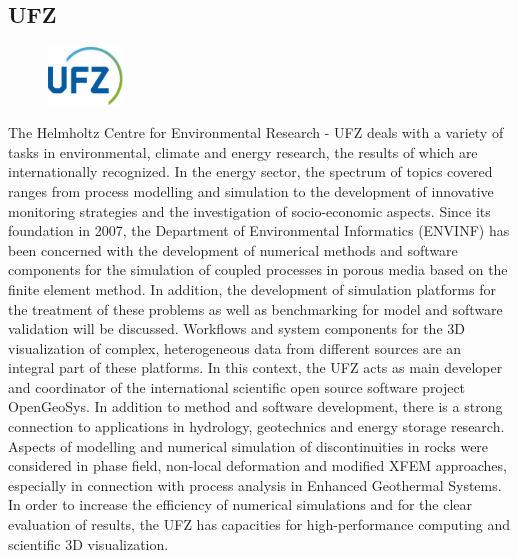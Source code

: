 \subsection{UFZ}
\begin{figure}
\centering
\includegraphics[width=2cm]{figures/ufz}
\end{figure}
The Helmholtz Centre for Environmental Research - UFZ deals with a variety of tasks in environmental, climate and energy research, the results of which are internationally recognized. In the energy sector, the spectrum of topics covered ranges from process modelling and simulation to the development of innovative monitoring strategies and the investigation of socio-economic aspects. Since its foundation in 2007, the Department of Environmental Informatics (ENVINF) has been concerned with the development of numerical methods and software components for the simulation of coupled processes in porous media based on the finite element method. In addition, the development of simulation platforms for the treatment of these problems as well as benchmarking for model and software validation will be discussed. Workflows and system components for the 3D visualization of complex, heterogeneous data from different sources are an integral part of these platforms. In this context, the UFZ acts as main developer and coordinator of the international scientific open source software project OpenGeoSys. In addition to method and software development, there is a strong connection to applications in hydrology, geotechnics and energy storage research. Aspects of modelling and numerical simulation of discontinuities in rocks were considered in phase field, non-local deformation and modified XFEM approaches, especially in connection with process analysis in Enhanced Geothermal Systems. In order to increase the efficiency of numerical simulations and for the clear evaluation of results, the UFZ has capacities for high-performance computing and scientific 3D visualization. 

